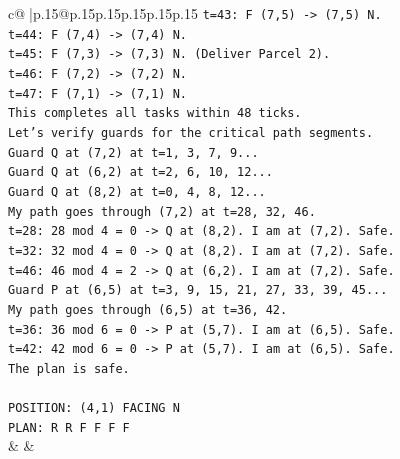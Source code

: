 \documentclass{article}
\begin{document}
{\begin{supertabular}{c@{$\;$}|p{.15\linewidth}@{}p{.15\linewidth}p{.15\linewidth}p{.15\linewidth}p{.15\linewidth}p{.15\linewidth}}
{{{\texttt{t=43: F (7,5) {-}> (7,5) N.} \\
\texttt{t=44: F (7,4) {-}> (7,4) N.} \\
\texttt{t=45: F (7,3) {-}> (7,3) N. (Deliver Parcel 2).} \\
\texttt{t=46: F (7,2) {-}> (7,2) N.} \\
\texttt{t=47: F (7,1) {-}> (7,1) N.} \\
\texttt{This completes all tasks within 48 ticks.} \\
\texttt{Let's verify guards for the critical path segments.} \\
\texttt{Guard Q at (7,2) at t=1, 3, 7, 9...} \\
\texttt{Guard Q at (6,2) at t=2, 6, 10, 12...} \\
\texttt{Guard Q at (8,2) at t=0, 4, 8, 12...} \\
\texttt{My path goes through (7,2) at t=28, 32, 46.} \\
\texttt{t=28: 28 mod 4 = 0 {-}> Q at (8,2). I am at (7,2). Safe.} \\
\texttt{t=32: 32 mod 4 = 0 {-}> Q at (8,2). I am at (7,2). Safe.} \\
\texttt{t=46: 46 mod 4 = 2 {-}> Q at (6,2). I am at (7,2). Safe.} \\
\texttt{Guard P at (6,5) at t=3, 9, 15, 21, 27, 33, 39, 45...} \\
\texttt{My path goes through (6,5) at t=36, 42.} \\
\texttt{t=36: 36 mod 6 = 0 {-}> P at (5,7). I am at (6,5). Safe.} \\
\texttt{t=42: 42 mod 6 = 0 {-}> P at (5,7). I am at (6,5). Safe.} \\
\texttt{The plan is safe.} \\
\\ 
\texttt{POSITION: (4,1) FACING N} \\
\texttt{PLAN: R R F F F F} \\
            }
        }
    }
    & & \\ \\


\end{supertabular}}
\end{document}
